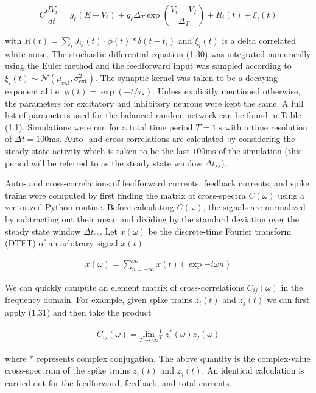 \documentclass{ucetd}
\begin{document}
\begin{equation}
C\frac{dV_{i}}{dt} = g_{\ell}(E - V_{i}) + g_{\ell}\Delta_{T}\exp\left(\frac{V_{i}-V_{T}}{\Delta_{T}}\right) + R_{i}(t) + \xi_{i}(t)
\end{equation}

with $R(t) = \sum_{i} J_{ij}(t)\cdot \phi(t) * \delta(t-t_{i})$ and $\xi_{i}(t)$ is a delta correlated white noise. The stochastic differential equation (1.30) was integrated numerically using the Euler method and the feedforward input was sampled according to $\xi_{i}(t) \sim \mathcal{N}(\mu_{\mathrm{ext}},\sigma_{\mathrm{ext}}^{2})$. The synaptic kernel was taken to be a decaying exponential i.e. $\phi(t) = \exp(-t/\tau_{s})$. Unless explicitly mentioned otherwise, the parameters for excitatory and inhibitory neurons were kept the same. A full list of parameters used for the balanced random network can be found in Table (1.1). Simulations were run for a total time period $T = 1 \;\mathrm{s}$ with a time resolution of $\Delta t = 100\mathrm{ms}$. Auto- and cross-correlations are calculated by considering the steady state activity which is taken to be the last $100\mathrm{ms}$ of the simulation (this period will be referred to as the steady state window $\Delta t_{ss}$).

Auto- and cross-correlations of feedforward currents, feedback currents, and spike trains were computed by first finding the matrix of cross-spectra $C(\omega)$ using a vectorized Python routine. Before calculating $C(\omega)$, the signals are normalized by subtracting out their mean and dividing by the standard deviation over the steady state window $\Delta t_{ss}$. Let $x(\omega)$ be the discrete-time Fourier transform (DTFT) of an arbitrary signal $x(t)$

\begin{align}
x(\omega) = \sum_{n =-\infty}^{\infty}x(t)\left(\exp{-i\omega n}\right)
\end{align}

We can quickly compute an element matrix of cross-correlations $C_{ij}(\omega)$ in the frequency domain. For example, given spike trains $z_{i}(t)$ and $z_{j}(t)$ we can first apply (1.31) and then take the product

\begin{align}
C_{ij}(\omega) = \underset{T\rightarrow\infty}{\mathrm{lim}}\frac{1}{T}\;z_{i}^{*}(\omega)z_{j}(\omega)
\end{align}

where $*$ represents complex conjugation. The above quantity is the complex-value cross-spectrum of the spike trains $z_{i}(t)$ and $z_{j}(t)$. An identical calculation is carried out for the feedforward, feedback, and total currents.
\end{document}

